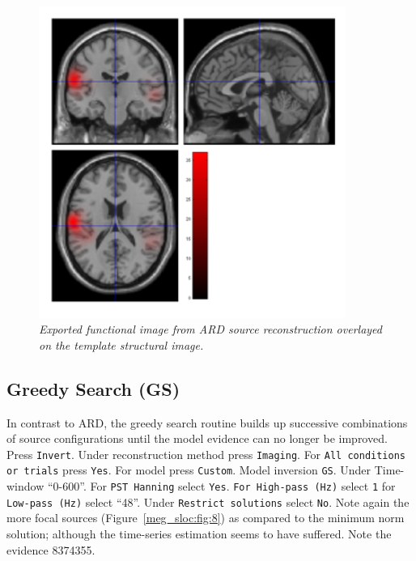 \begin{figure}
\begin{center}
\includegraphics[width=100mm]{meg_sloc/slide7}
\caption{\em Exported functional image from ARD source reconstruction overlayed on the template structural image.\label{meg_sloc:fig:7}}
\end{center}
\end{figure}


\subsection{Greedy Search (GS)}
In contrast to ARD, the greedy search routine builds up successive combinations of source configurations until the model evidence can no longer be improved.
Press \texttt{Invert}. Under reconstruction method press \texttt{Imaging}. For \texttt{All conditions or trials} press \texttt{Yes}. For model press \texttt{Custom}. Model inversion \texttt{GS}. Under Time-window ``0-600''. For \texttt{PST Hanning} select \texttt{Yes}. \texttt{For High-pass (Hz)} select \texttt{1} for \texttt{Low-pass (Hz)} select ``48''. Under \texttt{Restrict solutions} select \texttt{No}.  Note again the more focal sources (Figure~\ref{meg_sloc:fig:8}) as compared to the minimum norm solution; although the time-series estimation seems to have suffered. Note the evidence 8374355.

